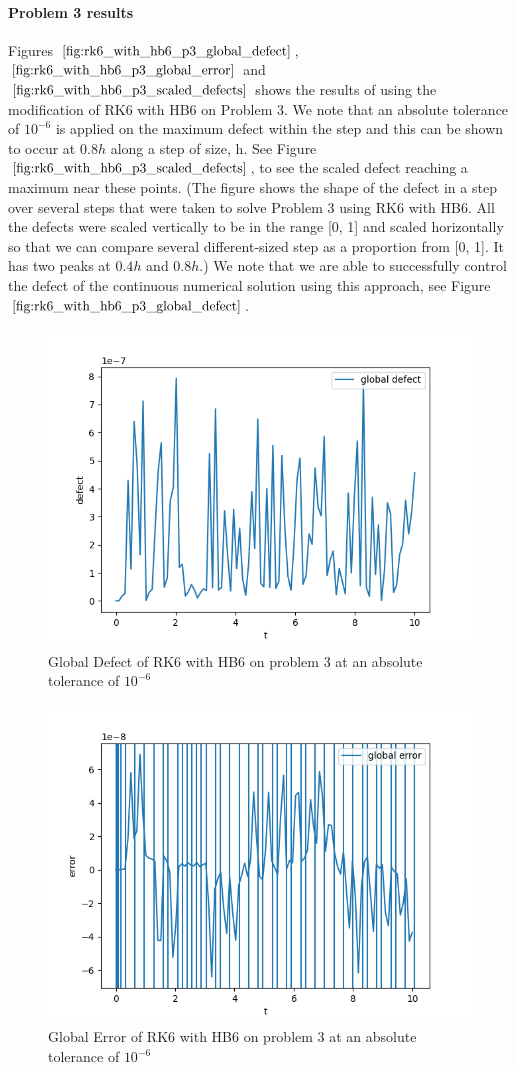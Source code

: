 \documentclass{article}
\begin{document}
\paragraph{Problem 3 results}
Figures $\ref{fig:rk6_with_hb6_p3_global_defect}$, $\ref{fig:rk6_with_hb6_p3_global_error}$ and $\ref{fig:rk6_with_hb6_p3_scaled_defects}$ shows the results of using the modification of RK6 with HB6 on Problem 3. 
We note that an absolute tolerance of $10^{-6}$ is applied on the maximum defect within the step and this can be shown to occur at $0.8h$ along a step of size, h. See Figure $\ref{fig:rk6_with_hb6_p3_scaled_defects}$, to see the scaled defect reaching a maximum near these points. (The figure shows the shape of the defect in a step over several steps that were taken to solve Problem 3 using RK6 with HB6. All the defects were scaled vertically to be in the range [0, 1] and scaled horizontally so that we can compare several different-sized step as a proportion from [0, 1]. It has two peaks at $0.4h$ and $0.8h$.) We note that we are able to successfully control the defect of the continuous numerical solution using this approach, see Figure $\ref{fig:rk6_with_hb6_p3_global_defect}$. 

\begin{figure}[H]
\centering
\includegraphics[width=0.7\linewidth]{./figures/rk6_with_hb6_p3_global_defect}
\caption{Global Defect of RK6 with HB6 on problem 3 at an absolute tolerance of $10^{-6}$}
\label{fig:rk6_with_hb6_p3_global_defect}
\end{figure}

\begin{figure}[H]
\centering
\includegraphics[width=0.7\linewidth]{./figures/rk6_with_hb6_p3_global_error}
\caption{Global Error of RK6 with HB6 on problem 3 at an absolute tolerance of $10^{-6}$}
\label{fig:rk6_with_hb6_p3_global_error}
\end{figure}
\end{document}
